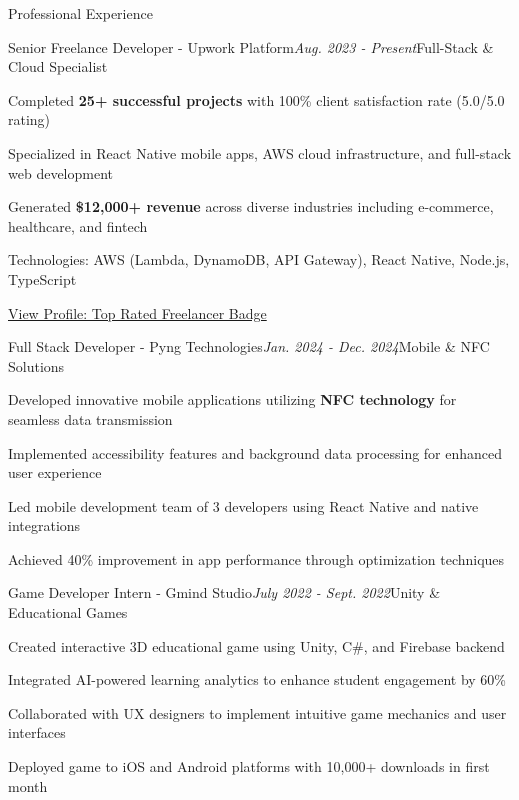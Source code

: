 \documentclass{resume}
\begin{document}
\begin{rSection}{Professional Experience}

\begin{rSubsection}{Senior Freelance Developer - Upwork Platform}{\em Aug. 2023 - Present}{Full-Stack \& Cloud Specialist}{}
\item Completed {\bf 25+ successful projects} with 100\% client satisfaction rate (5.0/5.0 rating)
\item Specialized in React Native mobile apps, AWS cloud infrastructure, and full-stack web development
\item Generated {\bf \$12,000+ revenue} across diverse industries including e-commerce, healthcare, and fintech
\item Technologies: AWS (Lambda, DynamoDB, API Gateway), React Native, Node.js, TypeScript
\item \href{https://www.upwork.com/freelancers/ramezn3?viewMode=1}{View Profile: Top Rated Freelancer Badge}
\end{rSubsection}

\begin{rSubsection}{Full Stack Developer - Pyng Technologies}{\em Jan. 2024 - Dec. 2024}{Mobile \& NFC Solutions}{}
\item Developed innovative mobile applications utilizing {\bf NFC technology} for seamless data transmission
\item Implemented accessibility features and background data processing for enhanced user experience
\item Led mobile development team of 3 developers using React Native and native integrations
\item Achieved 40\% improvement in app performance through optimization techniques
\end{rSubsection}

\begin{rSubsection}{Game Developer Intern - Gmind Studio}{\em July 2022 - Sept. 2022}{Unity \& Educational Games}{}
\item Created interactive 3D educational game using Unity, C\#, and Firebase backend
\item Integrated AI-powered learning analytics to enhance student engagement by 60\%
\item Collaborated with UX designers to implement intuitive game mechanics and user interfaces
\item Deployed game to iOS and Android platforms with 10,000+ downloads in first month
\end{rSubsection}


\end{rSection}
\end{document}
